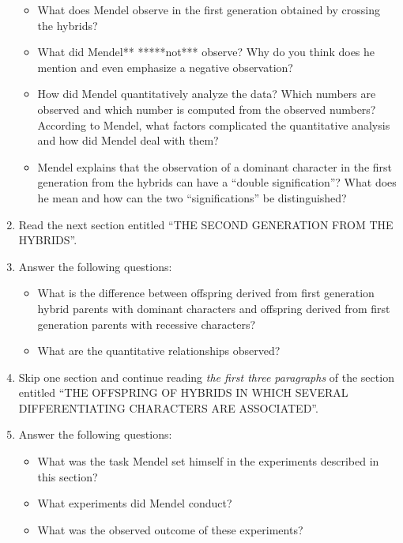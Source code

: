 \documentclass[]{book}
\providecommand{\tightlist}{%
  \setlength{\itemsep}{0pt}\setlength{\parskip}{0pt}}
\theoremstyle{definition}
\theoremstyle{definition}
\theoremstyle{definition}
\theoremstyle{remark}
\begin{document}
\begin{enumerate}
  \begin{itemize}
  \tightlist
  \item
    What does Mendel observe in the first generation obtained by
    crossing the hybrids?
  \item
    What did Mendel** *****not*** observe? Why do you think does he
    mention and even emphasize a negative observation?
  \item
    How did Mendel quantitatively analyze the data? Which numbers are
    observed and which number is computed from the observed numbers?
    According to Mendel, what factors complicated the quantitative
    analysis and how did Mendel deal with them?
  \item
    Mendel explains that the observation of a dominant character in the
    first generation from the hybrids can have a ``double
    signification''? What does he mean and how can the two
    ``significations'' be distinguished?
  \end{itemize}
\item
  Read the next section entitled ``THE SECOND GENERATION FROM THE
  HYBRIDS''.
\item
  Answer the following questions:

  \begin{itemize}
  \tightlist
  \item
    What is the difference between offspring derived from first
    generation hybrid parents with dominant characters and offspring
    derived from first generation parents with recessive characters?
  \item
    What are the quantitative relationships observed?
  \end{itemize}
\item
  Skip one section and continue reading \emph{the first three
  paragraphs} of the section entitled ``THE OFFSPRING OF HYBRIDS IN
  WHICH SEVERAL DIFFERENTIATING CHARACTERS ARE ASSOCIATED''.
\item
  Answer the following questions:

  \begin{itemize}
  \tightlist
  \item
    What was the task Mendel set himself in the experiments described in
    this section?
  \item
    What experiments did Mendel conduct?\\
  \item
    What was the observed outcome of these experiments?
  \end{itemize}
\end{enumerate}
\end{document}
